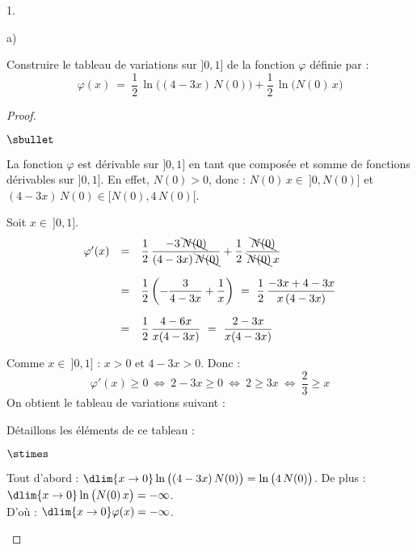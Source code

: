 \begin{noliste}{1.}
\begin{noliste}{a)}
    
    \newpage

    
    \item Construire le tableau de variations sur $]0,1]$ de la 
    fonction $\varphi$ définie par :
    \[
      \varphi(x) \ = \ \dfrac{1}{2} \, \ln\big((4-3x) \, N(0)\big) 
      + \dfrac{1}{2} \, \ln\big(N(0) \, x\big)
    \]
    
    \begin{proof}~
      \begin{noliste}{$\sbullet$}
	\item La fonction $\varphi$ est dérivable sur $]0,1]$ en tant 
	que composée et somme de fonctions dérivables sur $]0,1]$. 
	En effet, $N(0) >0$, donc : $N(0) \, x \in \ ]0,N(0)]$ et 
	$(4-3x) \, N(0) \in [N(0), 4 \, N(0)[$.

	
	\item Soit $x \in \ ]0,1]$.
	\[
	  \begin{array}{rcl}
	    \varphi'(x) &=& \dfrac{1}{2} \, \dfrac{-3 \, \bcancel{N(0)}}
	    {(4-3x) \, \bcancel{N(0)}} + \dfrac{1}{2} \, 
	    \dfrac{\bcancel{N(0)}}{\bcancel{N(0)} \, x}
	    \\[.6cm]
	    &=& \dfrac{1}{2} \left( - \dfrac{3}{4-3x} + \dfrac{1}{x}
	    \right) \ = \ \dfrac{1}{2} \, \dfrac{-3x+4-3x}{x \, 
	    (4-3x)}
	    \\[.6cm]
	    &=& \dfrac{1}{2} \, \dfrac{4-6x}{x(4-3x)} \ = \ 
	    \dfrac{2-3x}{x(4-3x)}
	  \end{array}
	\]
	
	\item Comme $x \in \ ]0,1]$ : $x >0$ et $4-3x>0$. Donc :
	\[
	  \varphi'(x) \geq 0 \ \Leftrightarrow \ 2-3x \geq 0 \
	  \Leftrightarrow \ 2 \geq 3x \ \Leftrightarrow \ 
	  \dfrac{2}{3} \geq x
	\]
	On obtient le tableau de variations suivant :
	\begin{center}
      \end{center}
      
      Détaillons les éléments de ce tableau :
      \begin{noliste}{$\stimes$}
	\item Tout d'abord : $\dlim{x\to 0} \ln \big( (4-3x) \, N(0)
	\big) = \ln\big(4 \, N(0)\big)$. De plus : $\dlim{x\to 0}
	\ln\big( N(0) \, x \big) = -\infty$.\\[.1cm]
	D'où : $\dlim{x\to 0} \varphi(x)=-\infty$.
	

\end{noliste}
\end{noliste}
\end{proof}
\end{noliste}
\end{noliste}
